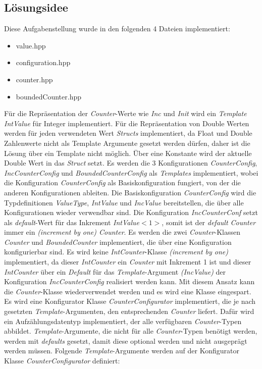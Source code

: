 \documentclass[11pt, a4paper, twoside]{article}   	%
\begin{document}
\subsection{Lösungsidee}
Diese Aufgabenstellung wurde in den folgenden 4 Dateien implementiert:
\begin{itemize}
	\item value.hpp
	\item configuration.hpp
	\item counter.hpp
	\item boundedCounter.hpp
\end{itemize}
Für die Repräsentation der \emph{Counter}-Werte wie \emph{Inc} und \emph{Init} wird ein \emph{Template IntValue} für Integer implementiert. Für die Repräsentation von Double Werten werden für jeden verwendeten Wert \emph{Structs} implementiert, da Float und Double Zahlenwerte nicht als Template Argumente gesetzt werden dürfen, daher ist die Lösung über ein Template nicht möglich. Über eine Konstante wird der aktuelle Double Wert in das \emph{Struct} setzt.    
\newline
\newline
Es werden die 3 Konfigurationen \emph{CounterConfig}, \emph{IncCounterConfig} und \emph{BoundedCounterConfig} als \emph{Templates} implementiert, wobei die Konfiguration \emph{CounterConfig} als Basiskonfiguration fungiert, von der die anderen Konfigurationen ableiten. Die Basiskonfiguration \emph{CounterConfig} wird die Typdefinitionen \emph{ValueType}, \emph{IntValue} und \emph{IncValue} bereitstellen, die über alle Konfigurationen wieder verwendbar sind. Die Konfiguration \emph{IncCounterConf} setzt als \emph{default}-Wert für das Inkrement \emph{IntValue$<1>$}, somit ist der \emph{default Counter} immer ein \emph{(increment by one) Counter}.
\newline
\newline
Es werden die zwei \emph{Counter}-Klassen \emph{Counter} und \emph{BoundedCounter} implementiert, die über eine Konfiguration konfigurierbar sind. Es wird keine \emph{IntCounter}-Klasse \emph{(increment by one)} implementiert, da dieser \emph{IntCounter} ein \emph{Counter} mit Inkrement 1 ist und dieser \emph{IntCounter} über ein \emph{Default} für das \emph{Template}-Argument \emph{(IncValue)} der Konfiguration \emph{IncCounterConfig} realisiert werden kann. Mit diesem Ansatz kann die \emph{Counter}-Klasse wiederverwendet werden und es wird eine Klasse eingespart.
\newline
\newline
Es wird eine Konfigurator Klasse \emph{CounterConfigurator} implementiert, die je nach gesetzten \emph{Template}-Argumenten, den entsprechenden \emph{Counter} liefert. Dafür wird ein Aufzählungsdatentyp implementiert, der alle verfügbaren \emph{Counter}-Typen abbildet. \emph{Template}-Argumente, die nicht für alle \emph{Counter}-Typen benötigt werden, werden mit \emph{defaults} gesetzt, damit diese optional werden und nicht ausgeprägt werden müssen. Folgende \emph{Template}-Argumente werden auf der Konfigurator Klasse \emph{CounterConfigurator} definiert:
\end{document}
